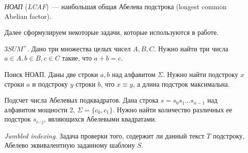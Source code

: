 \begin{definition}
\textit{НОАП} (\textit{LCAF})~--- наибольшая общая Абелева подстрока (longest common Abelian factor).
\end{definition}

Далее сформулируем некоторые задачи, которые используются в работе.

\begin{problem}
$3SUM^+$. Дано три множества целых чисел $A, B, C$. Нужно найти три числа $a \in A, b \in B, c \in C$ такие, что $a+b=c$.
\end{problem}

\begin{problem}
Поиск НОАП. Даны две строки $a, b$ над алфавитом $\Sigma$. Нужно найти подстроку $x$ строки $a$ и подстроку $y$ строки $b$, что $x \equiv y$, а длина подстрок максимальна.
\end{problem}

\begin{problem}
Подсчет числа Абелевых подквадратов. Дана строка $s=s_0s_1 \ldots s_{n-1}$ над алфавитом мощности 2, $\Sigma = \{c_0, c_1\}$. Нужно найти количество различных ее подстрок $s_{i \cdots j}$, являющихся Абелевыми квадратами.
\end{problem}

\begin{problem}
\textit{Jumbled indexing}. Задача проверки того, содержит ли данный текст $T$ подстроку, Абелево эквивалентную заданному шаблону $S$.
\end{problem}





